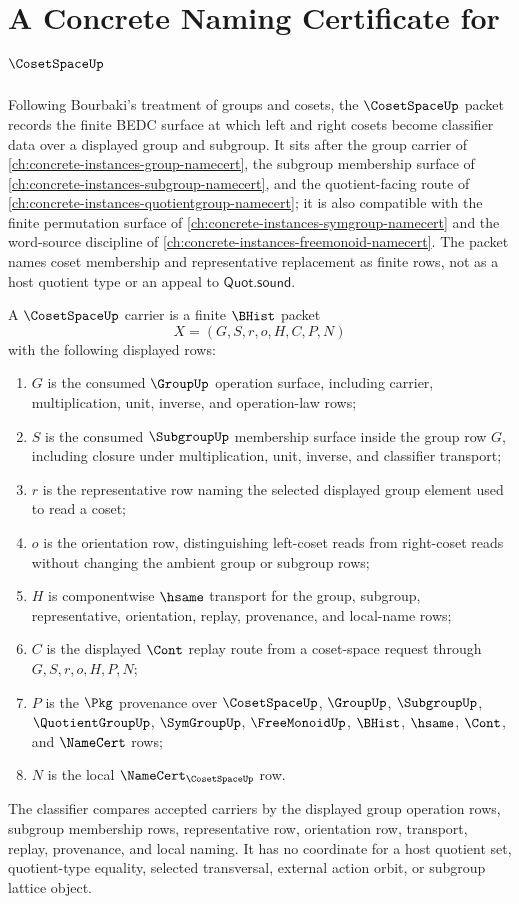 \chapter{A Concrete Naming Certificate for $\CosetSpaceUp$}
\label{ch:concrete-instances-coset-space-namecert}

Following Bourbaki's treatment of groups and cosets, the $\CosetSpaceUp$ packet records the finite BEDC surface at which left and right cosets become classifier data over a displayed group and subgroup. It sits after the group carrier of \autoref{ch:concrete-instances-group-namecert}, the subgroup membership surface of \autoref{ch:concrete-instances-subgroup-namecert}, and the quotient-facing route of \autoref{ch:concrete-instances-quotientgroup-namecert}; it is also compatible with the finite permutation surface of \autoref{ch:concrete-instances-symgroup-namecert} and the word-source discipline of \autoref{ch:concrete-instances-freemonoid-namecert}. The packet names coset membership and representative replacement as finite rows, not as a host quotient type or an appeal to $\mathsf{Quot.sound}$.

\begin{definition}
\label{def:coset-space-carrier}
A $\CosetSpaceUp$ carrier is a finite $\BHist$ packet
$$
X=(G,S,r,o,H,C,P,N)
$$
with the following displayed rows:
\begin{enumerate}
\item $G$ is the consumed $\GroupUp$ operation surface, including carrier, multiplication, unit, inverse, and operation-law rows;
\item $S$ is the consumed $\SubgroupUp$ membership surface inside the group row $G$, including closure under multiplication, unit, inverse, and classifier transport;
\item $r$ is the representative row naming the selected displayed group element used to read a coset;
\item $o$ is the orientation row, distinguishing left-coset reads from right-coset reads without changing the ambient group or subgroup rows;
\item $H$ is componentwise $\hsame$ transport for the group, subgroup, representative, orientation, replay, provenance, and local-name rows;
\item $C$ is the displayed $\Cont$ replay route from a coset-space request through $G,S,r,o,H,P,N$;
\item $P$ is the $\Pkg$ provenance over $\CosetSpaceUp$, $\GroupUp$, $\SubgroupUp$, $\QuotientGroupUp$, $\SymGroupUp$, $\FreeMonoidUp$, $\BHist$, $\hsame$, $\Cont$, and $\NameCert$ rows;
\item $N$ is the local $\NameCert_{\CosetSpaceUp}$ row.
\end{enumerate}
The classifier compares accepted carriers by the displayed group operation rows, subgroup membership rows, representative row, orientation row, transport, replay, provenance, and local naming. It has no coordinate for a host quotient set, quotient-type equality, selected transversal, external action orbit, or subgroup lattice object.
\end{definition}

